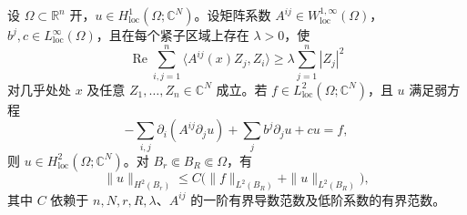 \begin{theorem}\label{g3:thm:weak-interior-h2}
	设 \(\Omega\subset\mathbb R^n\) 开，\(u\in H^1_{\mathrm{loc}}(\Omega;\mathbb C^N)\)。设矩阵系数 \(A^{ij}\in W^{1,\infty}_{\mathrm{loc}}(\Omega)\)，\(b^j,c\in L^\infty_{\mathrm{loc}}(\Omega)\)，且在每个紧子区域上存在 \(\lambda>0\)，使
	\begin{equation}\label{g3:eq:full-gradient-coercivity}
		\operatorname{Re}\sum_{i,j=1}^n\langle A^{ij}(x)Z_j,Z_i\rangle
		\ge\lambda\sum_{j=1}^n|Z_j|^2
	\end{equation}
	对几乎处处 \(x\) 及任意 \(Z_1,\ldots,Z_n\in\mathbb C^N\) 成立。若 \(f\in L^2_{\mathrm{loc}}(\Omega;\mathbb C^N)\)，且 \(u\) 满足弱方程
	\begin{equation}\label{g3:eq:weak-system-divergence}
		-\sum_{i,j}\partial_i(A^{ij}\partial_ju)
		+\sum_jb^j\partial_ju+cu=f,
	\end{equation}
	则 \(u\in H^2_{\mathrm{loc}}(\Omega;\mathbb C^N)\)。对 \(B_r\Subset B_R\Subset\Omega\)，有
	\begin{equation}\label{g3:eq:interior-h2-estimate}
		\|u\|_{H^2(B_r)}
		\le C\bigl(\|f\|_{L^2(B_R)}+\|u\|_{L^2(B_R)}\bigr),
	\end{equation}
	其中 \(C\) 依赖于 \(n,N,r,R,\lambda\)、\(A^{ij}\) 的一阶有界导数范数及低阶系数的有界范数。
\end{theorem}

